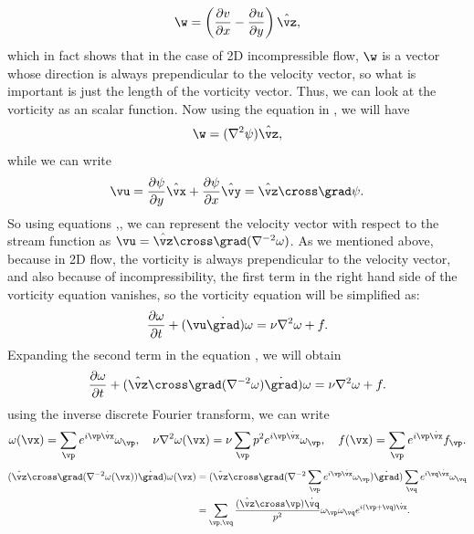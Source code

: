 \documentclass[12pt]{article}
\def\v{\bm}
\def\lap{{\nabla}^2}
\def\lapinv{{\nabla}^{-2}}
\def\vw{{\v\w}}
\begin{document}
\begin{equation}\label{omega}
\vw=\left(\frac{\partial v}{\partial x}-\frac{\partial u}{\partial y}\right)\hat{\vz},
\end{equation}
which in fact shows that in the case of 2D incompressible flow, $\vw$ is a vector whose direction is always prependicular to the velocity vector, so what is important is just the length of the vorticity vector. Thus, we can look at the vorticity as an scalar function. Now using the equation  in , we will have
\begin{equation}\label{omega-psi}
\vw=(\lap\psi)\hat{\vz},
\end{equation}
while we can write
\begin{equation}\label{u-psi}
\vu=\frac{\partial\psi}{\partial y}\hat{\vx}+\frac{\partial\psi}{\partial x}\hat{\vy}=\hat{\vz}\cross\grad\psi.
\end{equation}
So using equations ,, we can represent the velocity vector with respect to the stream function as $\vu=\hat{\vz}\cross\grad(\lapinv\omega)$. As we mentioned above, because in 2D flow, the vorticity is always prependicular to the velocity vector, and also because of incompressibility, the first term in the right hand side of the vorticity equation vanishes, so the vorticity equation will be simplified as:
\begin{equation}\label{2D-vorticity}
\frac{\partial \omega}{\partial t} + (\vu\dot\grad)\omega= \nu\lap\omega + f.
\end{equation}
Expanding the second term in the equation , we will obtain
\begin{equation}\label{2D-vorticity-expand}
\frac{\partial \omega}{\partial t} + (\hat{\vz}\cross\grad(\lapinv\omega)\dot\grad)\omega= \nu\lap\omega + f.
\end{equation}
using the inverse discrete Fourier transform, we can write
\begin{equation*}
\omega(\vx)=\sum_{\vp}{e^{i\vp\dot\vx}\omega_{\vp}}, \quad\nu\lap\omega(\vx)=\nu\sum_{\vp}{p^2 e^{i\vp\dot\vx}\omega_{\vp}}, \quad f(\vx)=\sum_{\vp}{e^{i\vp\dot\vx}f_{\vp}}.
\end{equation*}
\begin{align*}
(\hat{\vz}\cross\grad(\lapinv\omega(\vx))\dot\grad)\omega(\vx) &=(\hat{\vz}\cross\grad(\lapinv\sum_{\vp}{e^{i\vp\dot\vx}\omega_{\vp}})\dot\grad)\sum_{\vq}{e^{i\vq\dot\vx}\omega_{\vq}} \\
&=\sum_{\vp,\vq}{\frac{(\hat{\vz}\cross\vp)\dot\vq}{p^2}\omega_{\vp}\omega_{\vq}e^{i(\vp+\vq)\dot\vx}}.
\end{align*}
\end{document}
